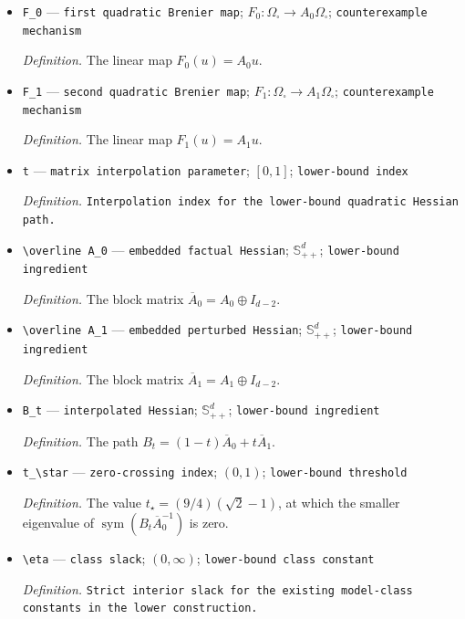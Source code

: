 \documentclass{article}
\begin{document}
\begin{itemize}
  \item \texttt{F\_\allowbreak{}0} --- \texttt{first quadratic Brenier map}; \(F_0:\Omega_{\square}\to A_0\Omega_{\square}\); \texttt{counterexample mechanism}
  \par\smallskip\noindent\emph{Definition.} The linear map \(F_0(u)=A_0u\).
  \item \texttt{F\_\allowbreak{}1} --- \texttt{second quadratic Brenier map}; \(F_1:\Omega_{\square}\to A_1\Omega_{\square}\); \texttt{counterexample mechanism}
  \par\smallskip\noindent\emph{Definition.} The linear map \(F_1(u)=A_1u\).
  \item \texttt{t} --- \texttt{matrix interpolation parameter}; \([0,1]\); \texttt{lower-\allowbreak{}bound index}
  \par\smallskip\noindent\emph{Definition.} \texttt{Interpolation index for the lower-\allowbreak{}bound quadratic Hessian path.}
  \item \texttt{\textbackslash{}\allowbreak{}overline A\_\allowbreak{}0} --- \texttt{embedded factual Hessian}; \(\mathbb S_{++}^d\); \texttt{lower-\allowbreak{}bound ingredient}
  \par\smallskip\noindent\emph{Definition.} The block matrix \(\overline A_0=A_0\oplus I_{d-2}\).
  \item \texttt{\textbackslash{}\allowbreak{}overline A\_\allowbreak{}1} --- \texttt{embedded perturbed Hessian}; \(\mathbb S_{++}^d\); \texttt{lower-\allowbreak{}bound ingredient}
  \par\smallskip\noindent\emph{Definition.} The block matrix \(\overline A_1=A_1\oplus I_{d-2}\).
  \item \texttt{B\_\allowbreak{}t} --- \texttt{interpolated Hessian}; \(\mathbb S_{++}^d\); \texttt{lower-\allowbreak{}bound ingredient}
  \par\smallskip\noindent\emph{Definition.} The path \(B_t=(1-t)\overline A_0+t\overline A_1\).
  \item \texttt{t\_\allowbreak{}\textbackslash{}\allowbreak{}star} --- \texttt{zero-\allowbreak{}crossing index}; \((0,1)\); \texttt{lower-\allowbreak{}bound threshold}
  \par\smallskip\noindent\emph{Definition.} The value \(t_\star=(9/4)(\sqrt2-1)\), at which the smaller eigenvalue of \(\operatorname{sym}(B_t\overline A_0^{-1})\) is zero.
  \item \texttt{\textbackslash{}\allowbreak{}eta} --- \texttt{class slack}; \((0,\infty)\); \texttt{lower-\allowbreak{}bound class constant}
  \par\smallskip\noindent\emph{Definition.} \texttt{Strict interior slack for the existing model-\allowbreak{}class constants in the lower construction.}

\end{itemize}
\end{document}
